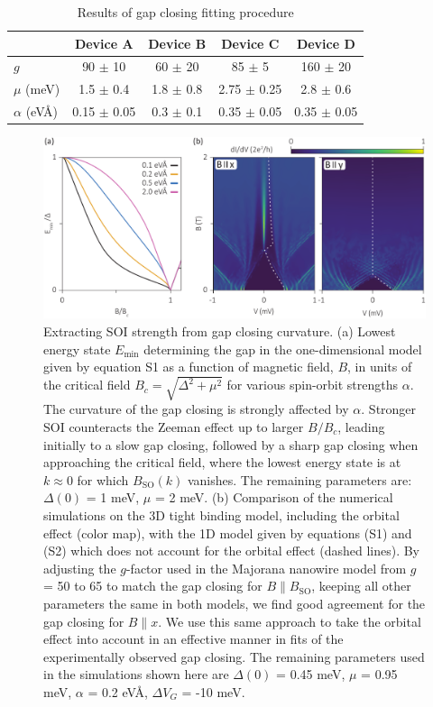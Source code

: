 \begin{table}[h]
\label{tab:AlphaFit}
\caption{Results of gap closing fitting procedure}
\begin{tabular}{l|cccc}
& Device A & Device B & Device C & Device D \\
\hline
$g$ & 90 $\pm$ 10 & 60 $\pm$ 20 & 85 $\pm$ 5 & 160 $\pm$ 20\\
$\mu$ (meV) & 1.5 $\pm$ 0.4 & 1.8 $\pm$ 0.8 & 2.75 $\pm$ 0.25 & 2.8 $\pm$ 0.6\\
$\alpha$ (eV\AA) & 0.15 $\pm$ 0.05 & 0.3 $\pm$ 0.1 & 0.35 $\pm$ 0.05 & 0.35 $\pm$ 0.05\\
\end{tabular}
\end{table}

\begin{figure}
\begin{center}
\centering
\includegraphics[width=0.7\columnwidth]{chapter_spinorbit/figures/SFig7_AlphaFitting.pdf}
\caption{\label{fig:SOIFit}
Extracting SOI strength from gap closing curvature.
(a) Lowest energy state $E_{\mathrm{min}}$ determining the gap in the one-dimensional model given by equation S1 as a function of magnetic field, $B$, in units of the critical field $B_c=\sqrt{\Delta^2+\mu^2}$ for various spin-orbit strengths $\alpha$.
The curvature of the gap closing is strongly affected by $\alpha$.
Stronger SOI counteracts the Zeeman effect up to larger $B/B_c$, leading initially to a slow gap closing, followed by a sharp gap closing when approaching the critical field, where the lowest energy state is at $k \approx 0$ for which $B_{\mathrm{SO}}(k)$ vanishes.
The remaining parameters are: $\Delta(0)$ = 1 meV, $\mu$ = 2 meV.
(b) Comparison of the numerical simulations on the 3D tight binding model, including the orbital effect (color map), with the 1D model given by equations (S1) and (S2) which does not account for the orbital effect (dashed lines).
By adjusting the $g$-factor used in the Majorana nanowire model from $g$ = 50 to 65 to match the gap closing for $B \parallel B_{\mathrm{SO}}$, keeping all other parameters the same in both models, we find good agreement for the gap closing for $B \parallel x$.
We use this same approach to take the orbital effect into account in an effective manner in fits of the experimentally observed gap closing.
The remaining parameters used in the simulations shown here are $\Delta(0)$ = 0.45 meV, $\mu$ = 0.95 meV, $\alpha$ = 0.2 eV\AA, $\Delta V_G$ = -10 meV.
}
\end{center}
\end{figure}

